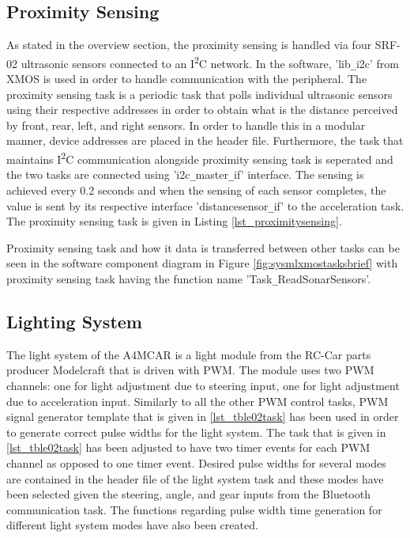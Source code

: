 \subsection{Proximity Sensing}
As stated in the overview section, the proximity sensing is handled via four SRF-02 ultrasonic sensors connected to an I\textsuperscript{2}C network. In the software, 'lib\texttt{\_}i2c' from XMOS is used in order to handle communication with the peripheral. The proximity sensing task is a periodic task that polls individual ultrasonic sensors using their respective addresses in order to obtain what is the distance perceived by front, rear, left, and right sensors. In order to handle this in a modular manner, device addresses are placed in the header file. Furthermore, the task that maintains I\textsuperscript{2}C communication alongside proximity sensing task is seperated and the two tasks are connected using 'i2c\texttt{\_}master\texttt{\_}if' interface. The sensing is achieved every 0.2 seconds and when the sensing of each sensor completes, the value is sent by its respective interface 'distancesensor\texttt{\_}if' to the acceleration task. The proximity sensing task is given in Listing \ref{lst_proximitysensing}.



Proximity sensing task and how it data is transferred between other tasks can be seen in the software component diagram in Figure \ref{fig:sysmlxmostasksbrief} with proximity sensing task having the function name 'Task\texttt{\_}ReadSonarSensors'.

\subsection{Lighting System}
The light system of the A4MCAR is a light module from the RC-Car parts producer Modelcraft that is driven with PWM. The module uses two PWM channels: one for light adjustment due to steering input, one for light adjustment due to acceleration input. Similarly to all the other PWM control tasks, PWM signal generator template that is given in \ref{lst_tble02task} has been used in order to generate correct pulse widths for the light system. The task that is given in \ref{lst_tble02task} has been adjusted to have two timer events for each PWM channel as opposed to one timer event. Desired pulse widths for several modes are contained in the header file of the light system task and these modes have been selected given the steering, angle, and gear inputs from the Bluetooth communication task. The functions regarding pulse width time generation for different light system modes have also been created. 

